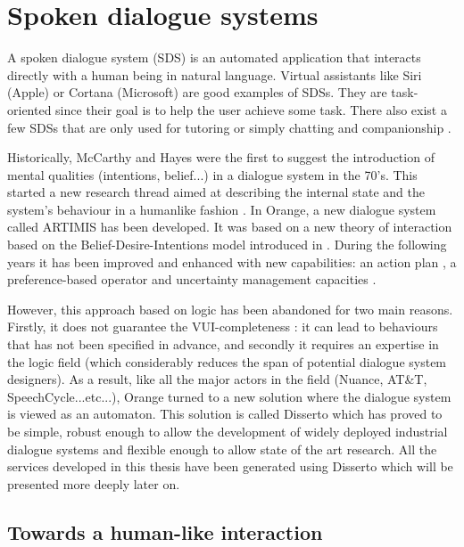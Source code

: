 \section{Spoken dialogue systems}
        
A spoken dialogue system (SDS) is an automated application that interacts directly with a human being in natural language. Virtual assistants like Siri (Apple) or Cortana (Microsoft) are good examples of SDSs. They are task-oriented since their goal is to help the user achieve some task. There also exist a few SDSs that are only used for tutoring \cite{Jordan2015} or simply chatting and companionship \cite{Sidner2013}.

Historically, McCarthy and Hayes were the first to suggest the introduction of mental qualities (intentions, belief...) in a dialogue system \cite{McCarthy1969,McCarthy1979} in the 70's. This started a new research thread aimed at describing the internal state and the system's behaviour in a humanlike fashion \cite{Newell1980,Bratman1987,Cohen1990,Sadek1991,Konolige1993}. In Orange, a new dialogue system called ARTIMIS has been developed. It was based on a new theory of interaction \cite{Sadek1991} based on the Belief-Desire-Intentions model introduced in \cite{Bratman1988}. During the following years it has been improved and enhanced with new capabilities: an action plan \cite{Louis2002}, a preference-based operator \cite{Meyer2006} and uncertainty management capacities \cite{Laroche2008}.

However, this approach based on logic has been abandoned for two main reasons. Firstly, it does not guarantee the VUI-completeness \cite{Pieraccini2005,Paek2008}: it can lead to behaviours that has not been specified in advance, and secondly it requires an expertise in the logic field (which considerably reduces the span of potential dialogue system designers). As a result, like all the major actors in the field (Nuance, AT\&T, SpeechCycle...etc...), Orange turned to a new solution where the dialogue system is viewed as an automaton. This solution is called Disserto which has proved to be simple, robust enough to allow the development of widely deployed industrial dialogue systems and flexible enough to allow state of the art research. All the services developed in this thesis have been generated using Disserto which will be presented more deeply later on.

\subsection{Towards a human-like interaction}
  \label{soa:humanlike}
  
